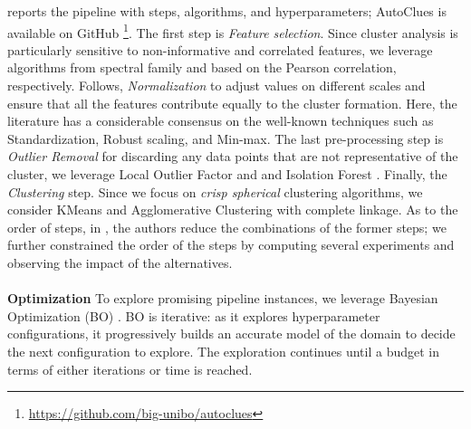 \documentclass[runningheads]{llncs}
\begin{document}
 reports the pipeline with steps, algorithms, and hyperparameters; AutoClues is available on GitHub \footnote{\url{https://github.com/big-unibo/autoclues}}.
The first step is \textit{Feature selection}. 
Since cluster analysis is particularly sensitive to non-informative and correlated features, we leverage algorithms from spectral family and based on the Pearson correlation, respectively. 
Follows, \textit{Normalization} to adjust values on different scales and ensure that all the features contribute equally to the cluster formation.
Here, the literature has a considerable consensus on the well-known techniques such as Standardization, Robust scaling, and Min-max.
The last pre-processing step is \textit{Outlier Removal} for discarding any data points that are not representative of the cluster, we leverage Local Outlier Factor \cite{breunig2000lof} and and Isolation Forest \cite{liu2012isolation}.
Finally, the \textit{Clustering} step.
Since we focus on \textit{crisp spherical} clustering algorithms, we consider KMeans \cite{arthur2006k} and Agglomerative Clustering \cite{murtagh2017algorithms} with complete linkage.
As to the order of steps, in \cite{giovanelli2022data}, the authors reduce the combinations of the former steps; we further constrained the order of the steps by computing several experiments and observing the impact of the alternatives.
\\
\\
\textbf{Optimization}
To explore promising pipeline instances, we leverage Bayesian Optimization (BO) \cite{hutter2011sequential}.
BO is iterative: as it explores hyperparameter configurations, it progressively builds an accurate model of the domain to decide the next configuration to explore.
The exploration continues until a budget in terms of either iterations or time is reached.
\end{document}
